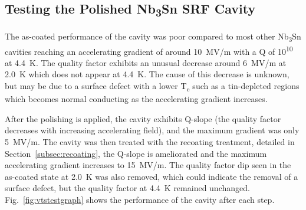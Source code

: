 %
\subsection{Testing the Polished Nb\textsubscript{3}Sn SRF Cavity}%
\label{subsec:cavityresults}%
The as-coated performance of the cavity was poor compared to most other Nb\textsubscript{3}Sn cavities reaching an accelerating gradient of around 10~MV/m with a Q of 10\textsuperscript{10} at 4.4~K. The quality factor exhibits an unusual decrease around 6~MV/m at 2.0~K which does not appear at 4.4~K. The cause of this decrease is unknown, but may be due to a surface defect with a lower T\textsubscript{c} such as a tin-depleted regions which becomes normal conducting as the accelerating gradient increases.

After the polishing is applied, the cavity exhibits Q-slope (the quality factor decreases with increasing accelerating field), and the maximum gradient was only 5~MV/m. The cavity was then treated with the recoating treatment, detailed in Section~\ref{subsec:recoating}, the Q-slope is ameliorated and the maximum accelerating gradient increases to 15~MV/m. The quality factor dip seen in the as-coated state at 2.0~K was also removed, which could indicate the removal of a surface defect, but the quality factor at 4.4~K remained unchanged. Fig.~\ref{fig:vtstestgraph} shows the performance of the cavity after each step.
%


